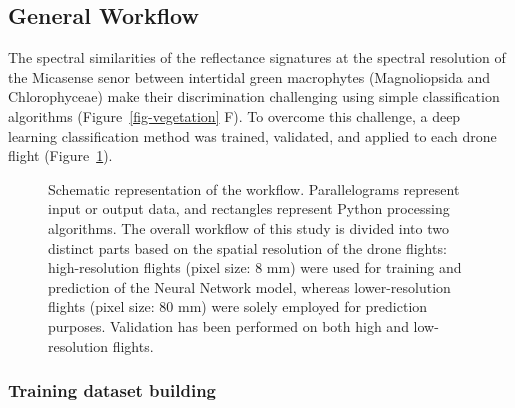 \documentclass[
  number]{elsarticle}
\begin{document}
\subsection{General Workflow}\label{general-workflow}

The spectral similarities of the reflectance signatures at the spectral
resolution of the Micasense senor between intertidal green macrophytes
(Magnoliopsida and Chlorophyceae) make their discrimination challenging
using simple classification algorithms (Figure~\ref{fig-vegetation} F).
To overcome this challenge, a deep learning classification method was
trained, validated, and applied to each drone flight
(Figure~\ref{fig-workflow}).

\label{cell-fig-workflow}
\begin{figure}[H]


\caption{\label{fig-workflow}Schematic representation of the workflow.
Parallelograms represent input or output data, and rectangles represent
Python processing algorithms. The overall workflow of this study is
divided into two distinct parts based on the spatial resolution of the
drone flights: high-resolution flights (pixel size: 8 mm) were used for
training and prediction of the Neural Network model, whereas
lower-resolution flights (pixel size: 80 mm) were solely employed for
prediction purposes. Validation has been performed on both high and
low-resolution flights.}

\end{figure}%

\subsubsection{Training dataset
building}\label{training-dataset-building}
\end{document}
